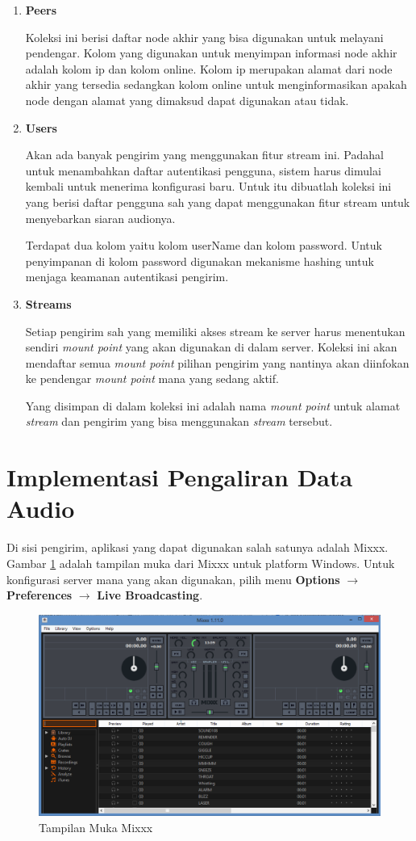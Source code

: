 \documentclass[oneside]{book}
\begin{document}
	\begin{enumerate}
		\item \textbf{Peers} 
		
		Koleksi ini berisi daftar node akhir yang bisa digunakan untuk melayani pendengar. Kolom yang digunakan untuk menyimpan informasi node akhir adalah kolom ip dan kolom online. Kolom ip merupakan alamat dari node akhir yang tersedia sedangkan kolom online untuk menginformasikan apakah node dengan alamat yang dimaksud dapat digunakan atau tidak.
		
		\item \textbf{Users}
		
		Akan ada banyak pengirim yang menggunakan fitur stream ini. Padahal untuk menambahkan daftar autentikasi pengguna, sistem harus dimulai kembali untuk menerima konfigurasi baru. Untuk itu dibuatlah koleksi ini yang berisi daftar pengguna sah yang dapat menggunakan fitur stream untuk menyebarkan siaran audionya.
		
		Terdapat dua kolom yaitu kolom userName dan kolom password. Untuk penyimpanan di kolom password digunakan mekanisme hashing untuk menjaga keamanan autentikasi pengirim.
		
		\item \textbf{Streams}
		
		Setiap pengirim sah yang memiliki akses stream ke server harus menentukan sendiri \textit{mount point} yang akan digunakan di dalam server. Koleksi ini akan mendaftar semua \textit{mount point} pilihan pengirim yang nantinya akan diinfokan ke pendengar \textit{mount point} mana yang sedang aktif. 
		
		Yang disimpan di dalam koleksi ini adalah nama \textit{mount point} untuk alamat \textit{stream} dan pengirim yang bisa menggunakan \textit{stream} tersebut.
	\end{enumerate}
	
	\section{Implementasi Pengaliran Data Audio}
	Di sisi pengirim, aplikasi yang dapat digunakan salah satunya adalah Mixxx. Gambar \ref{fig:mixxx} adalah tampilan muka dari Mixxx untuk platform Windows. Untuk konfigurasi server mana yang akan digunakan, pilih menu \textbf{Options} $\rightarrow$ \textbf{Preferences} $\rightarrow$ \textbf{Live Broadcasting}.
	
	
	\begin{figure}
		\centering
		\includegraphics[width=0.7\linewidth]{mixxx}
		\caption{Tampilan Muka Mixxx}
		\label{fig:mixxx}
	\end{figure}
\end{document}
